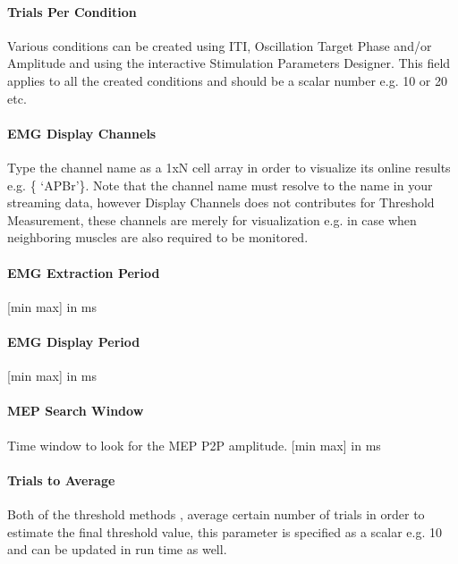 \documentclass[letterpaper,10pt,english]{sphinxmanual}
\begin{document}
\paragraph{Trials Per Condition}
\label{\detokenize{12_rTMSIntervention:trials-per-condition}}
\sphinxAtStartPar
Various conditions can be created using ITI, Oscillation Target Phase and/or Amplitude and using the interactive Stimulation Parameters Designer. This field applies to all the created conditions and should be a scalar number e.g. 10 or 20 etc.


\paragraph{EMG Display Channels}
\label{\detokenize{12_rTMSIntervention:emg-display-channels}}
\sphinxAtStartPar
Type the channel name as a 1xN cell array in order to visualize its online results e.g. \{ ‘APBr’\}. Note that the channel name must resolve to the name in your streaming data, however Display Channels does not contributes for Threshold Measurement, these channels are merely for visualization e.g. in case when neighboring muscles are also required to be monitored.


\paragraph{EMG Extraction Period}
\label{\detokenize{12_rTMSIntervention:emg-extraction-period}}
\sphinxAtStartPar
{[}min max{]} in ms


\paragraph{EMG Display Period}
\label{\detokenize{12_rTMSIntervention:emg-display-period}}
\sphinxAtStartPar
{[}min max{]} in ms


\paragraph{MEP Search Window}
\label{\detokenize{12_rTMSIntervention:mep-search-window}}
\sphinxAtStartPar
Time window to look for the MEP P2P amplitude. {[}min max{]} in ms


\paragraph{Trials to Average}
\label{\detokenize{12_rTMSIntervention:trials-to-average}}
\sphinxAtStartPar
Both of the threshold methods , average certain number of trials in order to estimate the final threshold value, this parameter is specified as a scalar e.g. 10 and can be updated in run time as well.
\end{document}
